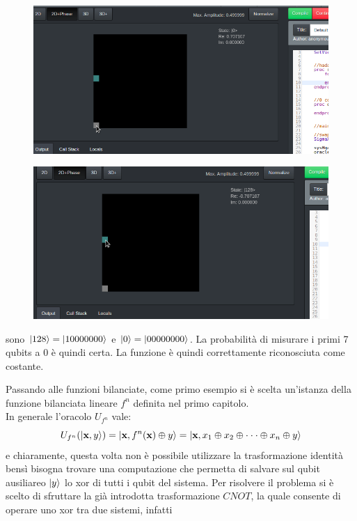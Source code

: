 \documentclass[12pt,a4paper,openright]{report}
\newcommand*\xor{\mathbin{\oplus}}
\begin{document}
\begin{figure}[h]

        \includegraphics[width=.92\textwidth,height=\textheight,keepaspectratio]{constantFunction3}
    
\end{figure}
\begin{figure}[h]

    \includegraphics[width=.92\textwidth,height=\textheight,keepaspectratio]{constantFunction2}
    
\end{figure}

sono $\ket{128}=\ket{10000000}$ e $\ket{0}=\ket{00000000}$. La probabilità di misurare i primi 7 qubits
a 0 è quindi certa. La funzione è quindi correttamente riconosciuta come costante.  \par
Passando alle funzioni bilanciate, come primo esempio si è scelta un'istanza della funzione bilanciata lineare $f^n$ definita nel primo capitolo. \\
In generale l'oracolo $U_{f^n}$ vale:
\[
    U_{f^n}(\ket{\textbf{x},y})= \ket{\textbf{x},f^n(\textbf{x}) \xor y} = \ket{\textbf{x}, x_1 \xor x_2 \xor \cdot\cdot\cdot \xor x_n \xor y}
\] 
e chiaramente, questa volta non è possibile utilizzare la trasformazione identità bensì bisogna trovare una computazione che permetta
di salvare sul qubit ausiliareo $\ket{y}$ lo xor di tutti i qubit del sistema. Per risolvere il problema si è scelto di sfruttare
la già introdotta trasformazione $CNOT$, la quale consente di operare uno xor tra due sistemi, infatti 
\end{document}
